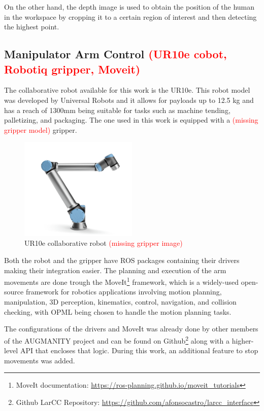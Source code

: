 On the other hand, the depth image is used to obtain the position of the human in the workspace by cropping it to a certain region of interest and then detecting the highest point.

\subsection{Manipulator Arm Control \textcolor{red}{(UR10e cobot, Robotiq gripper, Moveit)}}
\label{subsection:manipulator_arm_control}

The collaborative robot available for this work is the UR10e. This robot model was developed by Universal Robots and it allows for payloads up to 12.5 kg and has a reach of 1300mm being suitable for tasks such as machine tending, palletizing, and packaging\cite{UR10e}. The one used in this work is equipped with a \textcolor{red}{(missing gripper model)} gripper.

\begin{figure}[h]
\centerline{\includegraphics[width=0.5\textwidth]{figs/UR10e.png}}
\caption[UR10e]{UR10e collaborative robot \cite{UR10e_image} \textcolor{red}{(missing gripper image)}}
\label{fig:ur10e}
\end{figure}

Both the robot and the gripper have ROS packages containing their drivers making their integration easier. The planning and execution of the arm movements are done trough the MoveIt\footnote{MoveIt documentation: \url{https://ros-planning.github.io/moveit_tutorials}} framework, which is a widely-used open-source framework for robotics applications involving motion planning, manipulation, 3D perception, kinematics, control, navigation, and collision checking, with OPML being chosen to handle the motion planning tasks.

The configurations of the drivers and MoveIt was already done by other members of the AUGMANITY project and can be found on Github\footnote{Github LarCC Repository: \url{https://github.com/afonsocastro/larcc_interface}} along with a higher-level API that encloses that logic. During this work, an additional feature to stop movements was added.

